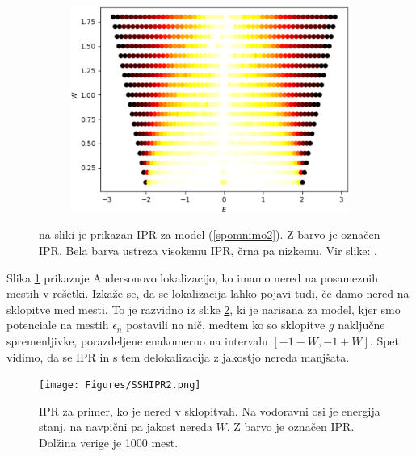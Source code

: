 \begin{figure}[!h]
\centering
\begin{subfigure}{.7\textwidth}
\includegraphics[width=\linewidth]{Figures/AndersonIPR.png}
\end{subfigure}
\caption{na sliki je prikazan IPR za model (\ref{spomnimo2}). Z barvo je označen IPR. Bela barva ustreza visokemu IPR, črna pa nizkemu. Vir slike: \cite{anderson}.}
\label{fig:AndersonIPR}
\end{figure}

Slika \ref{fig:AndersonIPR} prikazuje Andersonovo lokalizacijo, ko imamo nered na posameznih mestih v rešetki. Izkaže se, da se lokalizacija lahko pojavi tudi, če damo nered na sklopitve med mesti. To je razvidno iz slike \ref{fig:SSHIPR}, ki je narisana za model, kjer smo potenciale na mestih $\epsilon_n$ postavili na nič, medtem ko so sklopitve $g$ naključne spremenljivke, porazdeljene enakomerno na intervalu $[-1-W,-1+W]$. Spet vidimo, da se IPR in s tem delokalizacija z jakostjo nereda manjšata.
\begin{figure}[!h]
\centering
\texttt{[image: Figures/SSHIPR2.png]}
\caption{IPR za primer, ko je nered v sklopitvah. Na vodoravni osi je energija stanj, na navpični pa jakost nereda $W$. Z barvo je označen IPR. Dolžina verige je 1000 mest.}
\label{fig:SSHIPR}
\end{figure}


